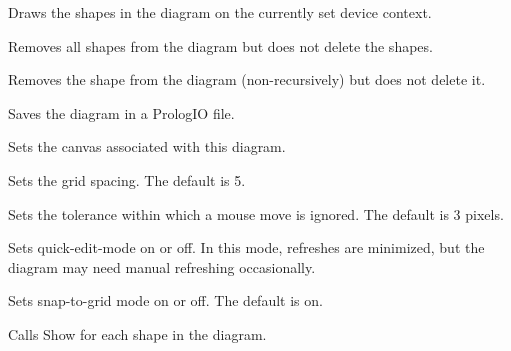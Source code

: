 Draws the shapes in the diagram on the currently set device context.



Removes all shapes from the diagram but does not delete the shapes.



Removes the shape from the diagram (non-recursively) but does not delete it.



Saves the diagram in a PrologIO file.



Sets the canvas associated with this diagram.



Sets the grid spacing. The default is 5.



Sets the tolerance within which a mouse move is ignored. The default is 3 pixels.



Sets quick-edit-mode on or off. In this mode, refreshes are minimized, but the
diagram may need manual refreshing occasionally.



Sets snap-to-grid mode on or off. The default is on.



Calls Show for each shape in the diagram.

